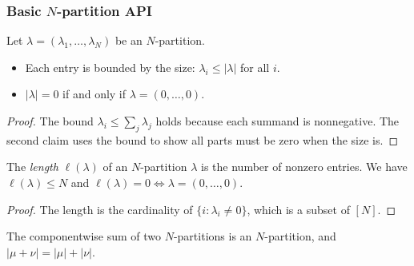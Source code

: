 \subsubsection{Basic $N$-partition API}

\begin{lemma}
\label{lem.sf.Npar-size}
\leanhelper
\leanok
Let $\lambda = (\lambda_1, \ldots, \lambda_N)$ be an $N$-partition.
\begin{itemize}
\item Each entry is bounded by the size: $\lambda_i \leq |\lambda|$ for all $i$.
\item $|\lambda| = 0$ if and only if $\lambda = (0, \ldots, 0)$.
\end{itemize}
\end{lemma}

\begin{proof}
The bound $\lambda_i \leq \sum_j \lambda_j$ holds because each summand is nonneg\-ative.
The second claim uses the bound to show all parts must be zero when the size is.
\end{proof}

\begin{lemma}
\label{lem.sf.Npar-length}
\leanhelper
\leanok
The \emph{length} $\ell(\lambda)$ of an $N$-partition $\lambda$ is the number of nonzero entries.
We have $\ell(\lambda) \leq N$ and $\ell(\lambda) = 0 \iff \lambda = (0, \ldots, 0)$.
\end{lemma}

\begin{proof}
\leanok
The length is the cardinality of $\{i : \lambda_i \neq 0\}$, which is a subset of $[N]$.
\end{proof}

\begin{lemma}
\label{lem.sf.Npar-add}
\leanhelper
\leanok
The componentwise sum of two $N$-partitions is an $N$-partition, and
$|\mu + \nu| = |\mu| + |\nu|$.
\end{lemma}

